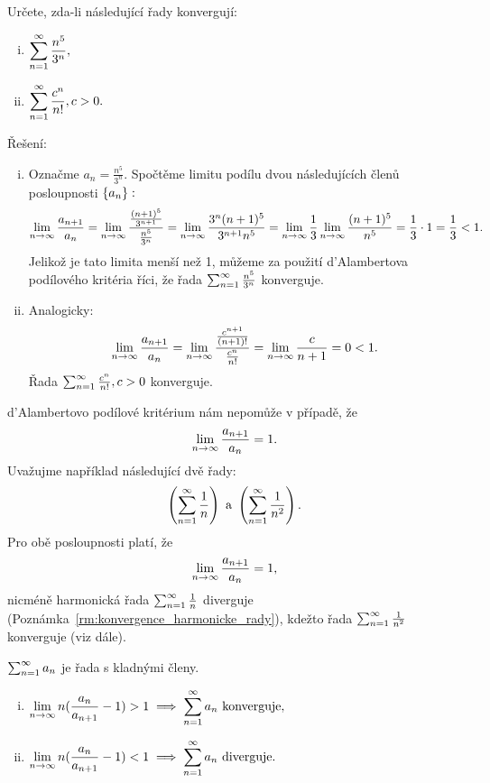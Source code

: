 \begin{example}
    Určete, zda-li následující řady konvergují:
    \begin{multicols}{2}
        \begin{enumerate}[(i)]
            \item $\displaystyle \sum_{n=1}^\infty \frac{n^5}{3^n},$
            \item $\displaystyle \sum_{n=1}^\infty \frac{c^n}{n!}, c > 0.$
        \end{enumerate}
    \end{multicols}

    Řešení:
    \begin{enumerate}[(i)]
        \item Označme $a_n = \frac{n^5}{3^n}.$ 
            Spočtěme limitu podílu dvou následujících členů posloupnosti 
            $\left\{a_n\right\}:$
            $$\lim_{n \to \infty} \frac{a_{n+1}}{a_n} 
            = \lim_{n \to \infty} \frac{\frac{(n+1)^5}{3^{n+1}}}{\frac{n^5}{3^n}}
            = \lim_{n \to \infty} \frac{3^n(n+1)^5}{3^{n+1}n^5}
            = \lim_{n \to \infty} \frac{1}{3} \lim_{n \to \infty} \frac{(n+1)^5}{n^5} 
            = \frac{1}{3}\cdot 1 = \frac{1}{3} < 1.$$
            Jelikož je tato limita menší než 1, můžeme za použití d'Alambertova
            podílového kritéria říci, že řada $\sum_{n=1}^\infty \frac{n^5}{3^n}$ konverguje.

        \item Analogicky:
            $$\lim_{n \to \infty} \frac{a_{n+1}}{a_n}
            = \lim_{n \to \infty} \frac{\frac{c^{n+1}}{(n+1)!}}{\frac{c^n}{n!}} 
            = \lim_{n \to \infty} \frac{c}{n+1} = 0 < 1.$$
            Řada $\sum_{n=1}^\infty \frac{c^n}{n!}, c > 0$ konverguje.
    \end{enumerate}
\end{example}

\begin{remark}
    d'Alambertovo podílové kritérium nám nepomůže v případě, že
    $$\lim_{n \to \infty} \frac{a_{n+1}}{a_n} = 1.$$ 
    Uvažujme například následující dvě řady:
    $$\left(\sum_{n=1}^\infty \frac{1}{n}\right) \text{ a } \left(\sum_{n=1}^\infty \frac{1}{n^2}\right).$$
    Pro obě posloupnosti platí, že
    $$\lim_{n \to \infty} \frac{a_{n+1}}{a_n} = 1,$$
    nicméně harmonická řada $\sum_{n=1}^\infty \frac{1}{n}$ diverguje 
    (Poznámka~\ref{rm:konvergence_harmonicke_rady}), kdežto řada
    $\sum_{n=1}^\infty \frac{1}{n^2}$ konverguje (viz dále).
\end{remark}

\begin{theorem}
    \Necht $\sum_{n=1}^\infty a_n$ je řada s kladnými členy.
    \begin{enumerate}[(i)]
        \item $\displaystyle \lim_{n \to \infty} n(\frac{a_n}{a_{n+1}} -1) > 1 \implies 
            \sum_{n=1}^\infty a_n \text{ konverguje},$
        \item $\displaystyle \lim_{n \to \infty} n(\frac{a_n}{a_{n+1}} -1) < 1 \implies
            \sum_{n=1}^\infty a_n \text{ diverguje}.$
    \end{enumerate}
\end{theorem}

